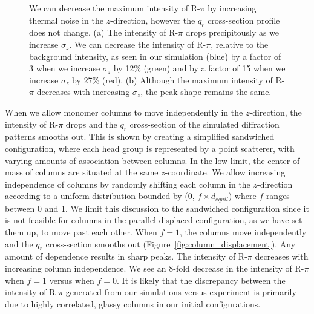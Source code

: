 \documentclass[journal=jpcbfk,manuscript=article]{achemso}
\begin{document}
\begin{figure}[!htb]
\begin{subfigure}{0.45\textwidth}
  \caption{}\label{fig:rpi_xsection_vs_zsigma}
  \end{subfigure}
  \caption{We can decrease the maximum intensity of R-$\pi$ by increasing
  thermal noise in the $z$-direction, however the $q_r$ cross-section profile does
  not change. (a) The intensity of R-$\pi$ drops precipitously as we increase
  $\sigma_z$. We can decrease the intensity of R-$\pi$, relative to the
  background intensity, as seen in our simulation (blue) by a factor of 3 when we
  increase $\sigma_z$ by 12\% (green) and by a factor of 15 when we increase
  $\sigma_z$ by 27\% (red). (b) Although the maximum intensity of R-$\pi$
  decreases with increasing $\sigma_z$, the peak shape remains the same.}\label{fig:znoise}
  \end{figure}
  
  When we allow monomer columns to move independently in the $z$-direction, the
  intensity of R-$\pi$ drops and the $q_r$ cross-section of the simulated
  diffraction patterns smooths out. This is shown by creating a simplified sandwiched
  configuration, where each head group is represented by a point scatterer,
  with varying amounts of association between columns. In the low limit, 
  the center of mass of columns are situated at the same $z$-coordinate. 
  We allow increasing independence of columns by randomly shifting each column
  in the $z$-direction according to a uniform distribution bounded by (0, 
  $f \times \mathit{d}_{equil}$) where $f$ ranges between 0 and 1. We limit 
  this discussion to the sandwiched configuration since it is not feasible for
  columns in the parallel displaced configuration, as we have set them up, to
  move past each other. When $f = 1$, the columns move independently and the
  $q_r$ cross-section smooths out (Figure~\ref{fig:column_displacement}). Any
  amount of dependence results in sharp peaks. The intensity of R-$\pi$ decreases
  with increasing column independence. We see an 8-fold decrease in the intensity
  of R-$\pi$ when $f=1$ versus when $f=0$. It is likely that the discrepancy 
  between the intensity of R-$\pi$ generated from our simulations versus experiment
  is primarily due to highly correlated, glassy columns in our initial configurations.
  
\end{document}

